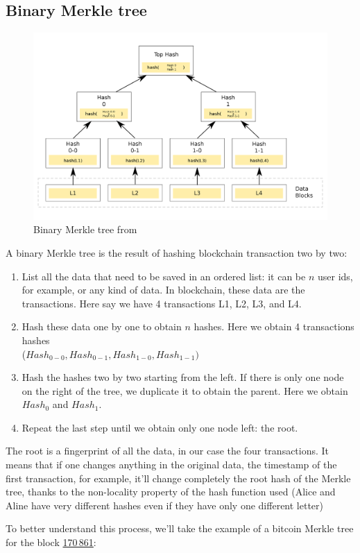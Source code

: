 \subsection{Binary Merkle tree}
\begin{figure}[H]
    \centering
\includegraphics[width=0.7\linewidth]{background/Merkle.png}
    \caption{Binary Merkle tree from \cite{wikimerkle}}
    \label{fig:Merkle}
\end{figure}
A binary Merkle tree is the result of hashing  blockchain transaction two by two: 
\begin{enumerate}
    \item List all the data that need to be saved in an ordered list: it can be $n$ user ids, for example, or any kind of data. In blockchain, these data are the transactions. Here say we have 4 transactions L1, L2, L3, and L4.
    \item Hash these data one by one to obtain $n$ hashes. Here we obtain 4 transactions hashes \\($Hash_{0-0},Hash_{0-1},Hash_{1-0},Hash_{1-1})$
    \item Hash the hashes two by two starting from the left. If there is only one node on the right of the tree, we duplicate it to obtain the parent. Here we obtain $Hash_0$ and $Hash_1$.
    \item Repeat the last step until we obtain only one node left: the root.
\end{enumerate}
The root is a fingerprint of all the data, in our case the four transactions. 
It means that if one changes anything in the original data, the timestamp of the first transaction, for example, it'll change completely the root hash of the Merkle tree, thanks to the non-locality property of the hash function used (Alice and Aline have very different hashes even if they have only one different letter)

To better understand this process, we'll take the example of a bitcoin Merkle tree for the block \href{https://www.blockchain.com/explorer/fr/explorer/blocks/btc/000000000000030de89e7729d5785c4730839b6e16ea9fb686a54818d3860a8d}{170 861}:

